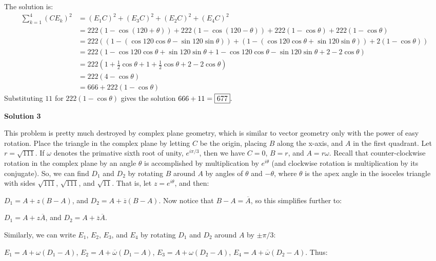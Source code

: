 \begin{enumerate}
 The solution is:
 \begin{align*} \sum_{k=1}^4(CE_k)^2 &= (E_1C)^2 + (E_3C)^2 + (E_2C)^2 + (E_4C)^2\\ &= 222(1 - \cos(120 + \theta)) + 222(1 - \cos(120 - \theta)) + 222(1 - \cos\theta) + 222(1 - \cos\theta)\\ &= 222((1 - (\cos120\cos\theta - \sin120\sin\theta)) + (1 - (\cos120\cos\theta + \sin120\sin\theta)) + 2(1 -\cos\theta))\\ &= 222(1 - \cos120\cos\theta + \sin120\sin\theta + 1 - \cos120\cos\theta - \sin120\sin\theta + 2 - 2\cos\theta)\\ &= 222(1 + \frac{1}{2}\cos\theta + 1 + \frac{1}{2}\cos\theta + 2 - 2\cos\theta)\\ &= 222(4 - \cos\theta)\\ &= 666 + 222(1 - \cos\theta) \end{align*}
Substituting $11$ for $222(1 - \cos\theta)$ gives the solution $666 + 11 = \framebox{677}.$




\textbf{Solution 3}

This problem is pretty much destroyed by complex plane geometry, which is similar to vector geometry only with the power of easy rotation.  Place the triangle in the complex plane by letting $C$ be the origin, placing $B$ along the x-axis, and $A$ in the first quadrant.  Let $r=\sqrt{111}$.  If $\omega$ denotes the primative sixth root of unity, $e^{i\pi/3}$, then we have $C=0$, $B=r$, and $A=r\omega.$  Recall that counter-clockwise rotation in the complex plane by an angle $\theta$ is accomplished by multiplication by $e^{i\theta}$ (and clockwise rotation is multiplication by its conjugate).  So, we can find $D_1$ and $D_2$ by rotating $B$ around $A$ by angles of $\theta$ and $-\theta$, where $\theta$ is the apex angle in the isoceles triangle with sides $\sqrt{111}$, $\sqrt{111}$, and $\sqrt{11}$.  That is, let $z=e^{i\theta}$, and then:

 $D_1=A+z(B-A)$, and $D_2=A+\overline{z}(B-A)$.  Now notice that $B-A=\overline{A}$, so this simplifies further to:

 $D_1=A+z\overline{A}$, and $D_2=A+\overline{z}\overline{A}$.  

 Similarly, we can write $E_1$, $E_2$, $E_3$, and $E_4$ by rotating $D_1$ and $D_2$ around $A$ by $\pm\pi/3$:

 $E_1=A+\omega(D_1-A)$, $E_2=A+\overline{\omega}(D_1-A)$, $E_3=A+\omega(D_2-A)$, $E_4=A+\overline{\omega}(D_2-A)$.  Thus:


\end{enumerate}

